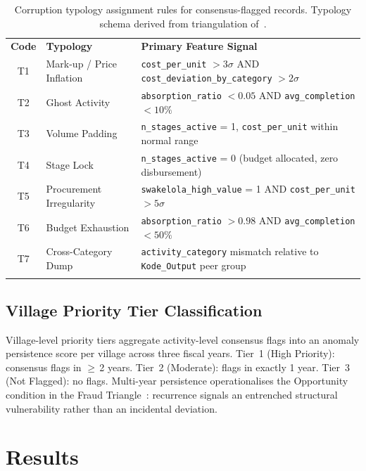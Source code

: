 \documentclass[3p,times,procedia]{elsarticle}
\begin{document}
\begin{table}[htb]
\caption{Corruption typology assignment rules for consensus-flagged records. Typology schema derived from triangulation of~\cite{ref6,ref13,ref14}.}
\label{tab:typo_rules}
\begin{tabular*}{\hsize}{@{\extracolsep{\fill}}cll@{}}
\toprule
\textbf{Code} & \textbf{Typology} & \textbf{Primary Feature Signal} \\
\colrule
T1 & Mark-up / Price Inflation   & \texttt{cost\_per\_unit} $> 3\sigma$ AND \texttt{cost\_deviation\_by\_category} $> 2\sigma$ \\
T2 & Ghost Activity              & \texttt{absorption\_ratio} $< 0.05$ AND \texttt{avg\_completion} $< 10\%$ \\
T3 & Volume Padding              & \texttt{n\_stages\_active} = 1, \texttt{cost\_per\_unit} within normal range \\
T4 & Stage Lock                  & \texttt{n\_stages\_active} = 0 (budget allocated, zero disbursement) \\
T5 & Procurement Irregularity    & \texttt{swakelola\_high\_value} = 1 AND \texttt{cost\_per\_unit} $> 5\sigma$ \\
T6 & Budget Exhaustion           & \texttt{absorption\_ratio} $> 0.98$ AND \texttt{avg\_completion} $< 50\%$ \\
T7 & Cross-Category Dump         & \texttt{activity\_category} mismatch relative to \texttt{Kode\_Output} peer group \\
\botrule
\end{tabular*}
\end{table}

\subsection{Village Priority Tier Classification}

Village-level priority tiers aggregate activity-level consensus flags into an anomaly persistence score per village across three fiscal years. Tier~1 (High Priority): consensus flags in $\geq$\,2 years. Tier~2 (Moderate): flags in exactly 1 year. Tier~3 (Not Flagged): no flags. Multi-year persistence operationalises the Opportunity condition in the Fraud Triangle~\cite{ref17}: recurrence signals an entrenched structural vulnerability rather than an incidental deviation.

\section{Results}
\label{sec:results}
\end{document}
